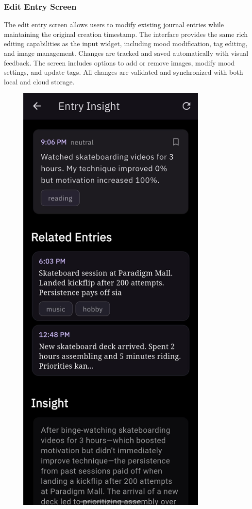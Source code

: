 \subsubsection{Edit Entry Screen}

The edit entry screen allows users to modify existing journal entries while maintaining the original creation timestamp. The interface provides the same rich editing capabilities as the input widget, including mood modification, tag editing, and image management. Changes are tracked and saved automatically with visual feedback. The screen includes options to add or remove images, modify mood settings, and update tags. All changes are validated and synchronized with both local and cloud storage.

\begin{figure}[H]
\centering
\begin{minipage}{0.45\textwidth}
\centering
\includegraphics[width=0.85\textwidth]{files/imgs/prototype/entry_insight_screen.jpeg}

\end{minipage}
\end{figure}

